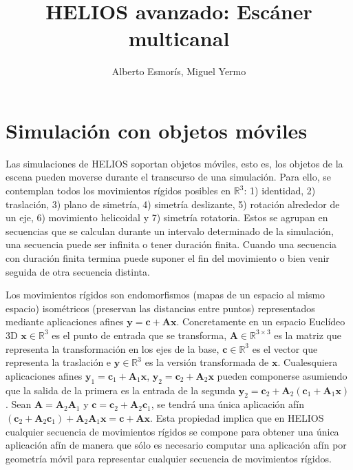 \documentclass[]{article}
\title{HELIOS avanzado: Escáner multicanal}
\author{Alberto Esmorís, Miguel Yermo}
\date{}
\begin{document}
	
	\maketitle
	
	
	
	\section*{Simulación con objetos móviles}
	Las simulaciones de HELIOS soportan objetos móviles, esto es, los objetos de la escena pueden moverse durante el transcurso de una simulación. Para ello, se contemplan todos los movimientos rígidos posibles en $\mathbb{R}^{3}$: 1) identidad, 2) traslación, 3) plano de simetría, 4) simetría deslizante, 5) rotación alrededor de un eje, 6) movimiento helicoidal y 7) simetría rotatoria. Estos se agrupan en secuencias que se calculan durante un intervalo determinado de la simulación, una secuencia puede ser infinita o tener duración finita. Cuando una secuencia con duración finita termina puede suponer el fin del movimiento o bien venir seguida de otra secuencia distinta.
	
	Los movimientos rígidos son endomorfismos (mapas de un espacio al mismo espacio) isométricos (preservan las distancias entre puntos) representados mediante aplicaciones afines $\pmb{y} = \pmb{c} + \pmb{A} \pmb{x}$. Concretamente en un espacio Euclídeo 3D $\pmb{x} \in \mathbb{R}^{3}$ es el punto de entrada que se transforma, $\pmb{A} \in \mathbb{R}^{3\times3}$ es la matriz que representa la transformación en los ejes de la base, $\pmb{c} \in \mathbb{R}^3$ es el vector que representa la traslación e $\pmb{y} \in \mathbb{R}^{3}$ es la versión transformada de $\pmb{x}$. Cualesquiera aplicaciones afines $\pmb{y}_1 = \pmb{c}_1 + \pmb{A}_1 \pmb{x}$, $\pmb{y}_2 = \pmb{c}_2 + \pmb{A}_2 \pmb{x}$ pueden componerse asumiendo que la salida de la primera es la entrada de la segunda $\pmb{y}_2 = \pmb{c}_2 + \pmb{A}_2 (\pmb{c}_1 + \pmb{A}_1 \pmb{x})$. Sean $\pmb{A} = \pmb{A}_2 \pmb{A}_1$ y $\pmb{c} = \pmb{c}_2 + \pmb{A}_2 \pmb{c}_1$, se tendrá una única aplicación afín $(\pmb{c}_2 + \pmb{A}_2 \pmb{c}_1) + \pmb{A}_2 \pmb{A}_1 \pmb{x} = \pmb{c} + \pmb{A}\pmb{x}$. Esta propiedad implica que en HELIOS cualquier secuencia de movimientos rígidos se compone para obtener una única aplicación afín de manera que sólo es necesario computar una aplicación afín por geometría móvil para representar cualquier secuencia de movimientos rígidos.
\end{document}

